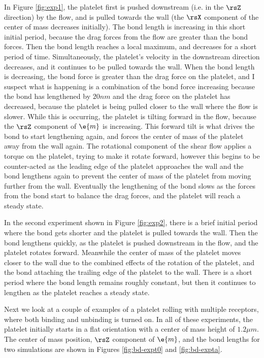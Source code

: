 In Figure \ref{fig:exp1}, the platelet first is pushed downstream
(i.e. in the $\rsZ$ direction) by the flow, and is pulled towards the
wall (the $\rsX$ component of the center of mass decreases
initially). The bond length is increasing in this short initial
period, because the drag forces from the flow are greater than the
bond forces. Then the bond length reaches a local maximum, and
decreases for a short period of time. Simultaneously, the platelet's
velocity in the downstream direction decreases, and it continues to be
pulled towards the wall. When the bond length is decreasing, the bond
force is greater than the drag force on the platelet, and I suspect
what is happening is a combination of the bond force increasing
because the bond has lengthened by $20 nm$ and the drag force on the
platelet has decreased, because the platelet is being pulled closer to
the wall where the flow is slower. While this is occurring, the
platelet is tilting forward in the flow, because the $\rsZ$ component
of $\e{m}$ is increasing. This forward tilt is what drives the bond to
start lengthening again, and forces the center of mass of the platelet
away from the wall again. The rotational component of the shear flow
applies a torque on the platelet, trying to make it rotate forward,
however this begins to be counter-acted as the leading edge of the
platelet approaches the wall and the bond lengthens again to prevent
the center of mass of the platelet from moving further from the
wall. Eventually the lengthening of the bond slows as the forces from
the bond start to balance the drag forces, and the platelet will reach
a steady state.

In the second experiment shown in Figure \ref{fig:exp2}, there is a
brief initial period where the bond gets shorter and the platelet is
pulled towards the wall. Then the bond lengthens quickly, as the
platelet is pushed downstream in the flow, and the platelet rotates
forward. Meanwhile the center of mass of the platelet moves closer to
the wall due to the combined effects of the rotation of the platelet,
and the bond attaching the trailing edge of the platelet to the
wall. There is a short period where the bond length remains roughly
constant, but then it continues to lengthen as the platelet reaches a
steady state.

Next we look at a couple of examples of a platelet rolling with
multiple receptors, where both binding and unbinding is turned on. In
all of these experiments, the platelet initially starts in a flat
orientation with a center of mass height of $1.2 \mu m$. %
The center of mass position, $\rsZ$ component of $\e{m}$, and the bond
lengths for two simulations are shown in Figures \ref{fig:bd-expt0}
and \ref{fig:bd-expta}. 

